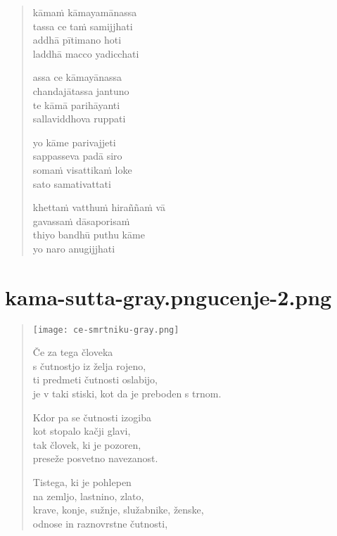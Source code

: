 

\cleartoverso

\vspace*{30mm}

\begin{verse}

kāmaṁ kāmayamānassa\\
tassa ce taṁ samijjhati\\
addhā pītimano hoti\\
laddhā macco yadicchati

assa ce kāmayānassa\\
chandajātassa jantuno\\
te kāmā parihāyanti\\
sallaviddhova ruppati

yo kāme parivajjeti\\
sappasseva padā siro\\
somaṁ visattikaṁ loke\\
sato samativattati

khettaṁ vatthuṁ hiraññaṁ vā\\
gavassaṁ dāsaporisaṁ\\
thiyo bandhū puthu kāme\\
yo naro anugijjhati

\end{verse}


\chapter[Kāma Sutta]{{kama-sutta-gray.png}{ucenje-2.png}}

\begin{verse}

\vFirst
\texttt{[image: ce-smrtniku-gray.png]}


Če za tega človeka\\
s čutnostjo iz želja rojeno,\\
ti predmeti čutnosti oslabijo,\\
je v taki stiski, kot da je preboden s trnom.

Kdor pa se čutnosti izogiba\\
kot stopalo kačji glavi,\\
tak človek, ki je pozoren,\\
preseže posvetno navezanost.

Tistega, ki je pohlepen\\
na zemljo, lastnino, zlato,\\
krave, konje, sužnje, služabnike, ženske,\\
odnose in raznovrstne čutnosti,

\end{verse}

